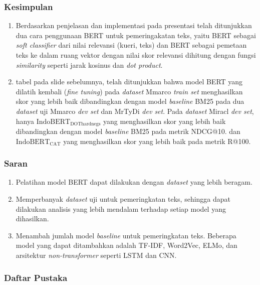 \documentclass[10pt]{beamer}
\newcommand{\f}[1]{\textit{#1}}
\begin{document}
\begin{frame}
    \frametitle{Kesimpulan}
    \begin{enumerate}
        \item  Berdasarkan penjelasan dan implementasi pada presentasi telah ditunjukkan dua cara penggunaan BERT untuk pemeringakatan teks, yaitu BERT sebagai \f{soft classifier} dari nilai relevansi (kueri, teks) dan BERT sebagai pemetaan teks ke dalam ruang vektor dengan nilai skor relevansi dihitung dengan fungsi \f{similarity} seperti jarak kosinus dan \f{dot product}.
        \item tabel pada slide sebelumnya, telah ditunjukkan bahwa model BERT yang dilatih kembali (\f{fine tuning}) pada \f{dataset} Mmarco \f{train set} menghasilkan skor yang lebih baik dibandingkan dengan model \f{baseline} BM25 pada dua \f{dataset} uji Mmarco \f{dev set} dan MrTyDi \f{dev set}. Pada \f{dataset} Miracl \f{dev set}, hanya $\text{IndoBERT}_{\text{DOThardnegs}}$ yang menghasilkan skor yang lebih baik dibandingkan dengan model \f{baseline} BM25 pada metrik NDCG@10. dan $\text{IndoBERT}_{\text{CAT}}$ yang menghasilkan skor yang lebih baik pada metrik R@100.
    \end{enumerate}
\end{frame}


\begin{frame}
    \frametitle{Saran}
    \begin{enumerate}
        \item Pelatihan model BERT dapat dilakukan dengan \f{dataset} yang lebih beragam. 
        \item Memperbanyak \f{dataset} uji untuk pemeringkatan teks, sehingga dapat dilakukan analisis yang lebih mendalam terhadap setiap model yang dihasilkan.
        \item Menambah jumlah model \f{baseline} untuk pemeringkatan teks. Beberapa model yang dapat ditambahkan adalah TF-IDF, Word2Vec, ELMo, dan arsitektur \f{non-transformer} seperti LSTM dan CNN.
    \end{enumerate}
    
\end{frame}

\begin{frame}[allowframebreaks]
    \frametitle{Daftar Pustaka}
    
\end{frame}
\end{document}
